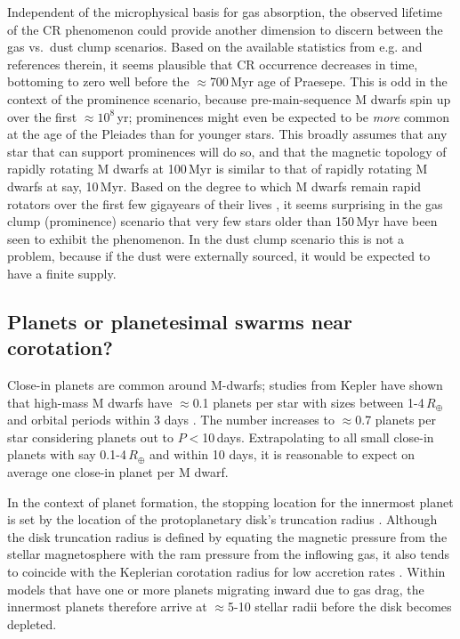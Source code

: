 \documentclass[11pt,twocolumn,tighten]{aastex63}
\begin{document}
Independent of the microphysical basis for gas absorption, the
observed lifetime of the CR phenomenon could provide another
dimension to discern between the gas vs.~dust clump scenarios.
Based on the available statistics from e.g.
\citet{2022AJ....164...80R} and references therein, it seems plausible
that CR occurrence decreases in time, bottoming to zero well before
the $\approx$700\,Myr age of Praesepe.  This is odd in the context of
the prominence scenario, because pre-main-sequence M dwarfs spin up
over the first $\approx$$10^8$\,yr; prominences might even be expected
to be {\it more} common at the age of the Pleiades than for younger
stars.  This broadly assumes that any star that can support
prominences will do so, and that the magnetic topology of rapidly
rotating M dwarfs at 100\,Myr is similar to that of rapidly rotating M
dwarfs at say, 10\,Myr.  Based on the degree to which M dwarfs remain
rapid rotators over the first few gigayears of their lives
\citep[e.g.][]{2022AJ....164...80R,2022ApJ...936..109P}, it seems
surprising in the gas clump (prominence) scenario that very few stars
older than 150\,Myr have been seen to exhibit the phenomenon.  In the
dust clump scenario this is not a problem, because if the dust were
externally sourced, it would be expected to have a finite supply.


\subsection{Planets or planetesimal swarms near corotation?}

Close-in planets are common around M-dwarfs; studies from Kepler have
shown that high-mass M dwarfs have $\approx$0.1 planets per star with
sizes between 1-4\,$R_\oplus$ and orbital periods within 3 days
\citep{2015ApJ...807...45D}.  The number increases to $\approx$0.7
planets per star considering planets out to $P$$<$10\,days.
Extrapolating to all small close-in planets with say 0.1-4\,$R_\oplus$
and within 10 days, it is reasonable to expect on average one close-in
planet per M dwarf.

In the context of planet formation, the stopping location for the
innermost planet is set by the location of the protoplanetary disk's
truncation radius \citep{2018haex.bookE.142I}.  Although the disk
truncation radius is defined by equating the magnetic pressure from
the stellar magnetosphere with the ram pressure from the inflowing
gas, it also tends to coincide with the Keplerian corotation radius
for low accretion rates
\citep{2016ARA&A..54..135H,2022MNRAS.510.5246L}.  Within models that
have one or more planets migrating inward due to gas drag, the
innermost planets therefore arrive at $\approx$5-10 stellar radii
before the disk becomes depleted.
\end{document}

